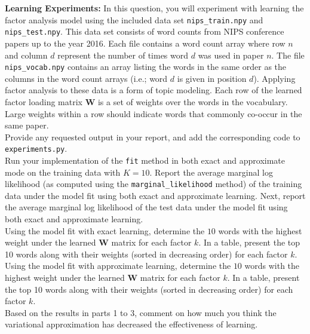 \documentclass[11pt]{article}
\newcommand{\mbf}[1]{{\mathbf{#1}}}
\begin{document}
\begin{problem}{20} \textbf{Learning Experiments:}  In this question, you will experiment with 
learning the factor analysis model using the included data set \verb|nips_train.npy|
and \verb|nips_test.npy|. This data set consists of word counts from NIPS conference papers
up to the year 2016. Each file contains a word count array where row $n$
and column $d$ represent the number of times word $d$ was used in paper $n$. 
The file \verb|nips_vocab.npy| contains an array listing the words in the same 
order as the columns in the word count arrays (i.e.; word $d$ is given in position $d$).
Applying factor analysis to these data is a form of topic modeling. Each row of the learned factor loading
matrix $\mbf{W}$ is a set of weights over the words in the vocabulary. Large
weights within a row should indicate words that commonly co-occur in the same paper.\\

Provide any requested output in your report, and add the corresponding code to \verb|experiments.py|.\\

 Run your implementation of the \verb|fit| method in both exact and 
approximate mode on the training data with $K=10$. Report the average marginal log likelihood 
(as computed using the \verb|marginal_likelihood| method) of the
training data under the model fit using both exact and approximate learning. Next,
report the average marginal log likelihood of the
test data under the model fit using both exact and approximate learning.\\

 Using the model fit with exact learning,
determine the $10$ words with the highest weight under the learned 
$\mbf{W}$ matrix for each factor $k$. 
In a table, present the top 10 words along with their weights (sorted in decreasing order) for
each factor $k$. \\

 Using the model fit with approximate learning,
determine the $10$ words with the highest weight under the learned 
$\mbf{W}$ matrix for each factor $k$. 
In a table, present the top 10 words along with their weights (sorted in decreasing order) for
each factor $k$. \\
 
 Based on the results in parts 1 to 3, comment on how much you think the variational
approximation has decreased the effectiveness of learning.

\end{problem}

\showpoints
\end{document}
